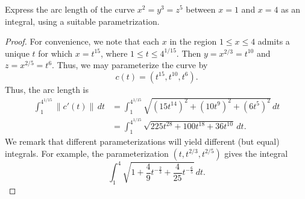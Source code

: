\documentclass[openany]{book}
\begin{document}
\begin{prob}[13]
    Express the arc length of the curve \( x^2 = y^3 = z^5 \) between \( x = 1 \) and \( x = 4 \) as an integral, using a suitable parametrization.
\end{prob}
\begin{proof}
    For convenience, we note that each $x$ in the region $1\le x\le 4$ admits a unique $t$ for which $x=t^{15}$, where $1\le t\le 4^{1/15}$. Then $y=x^{2/3}=t^{10}$ and $z=x^{2/5}=t^6$. Thus, we may parameterize the curve by
    \[c(t)=\left(t^{15},t^{10},t^{6}\right).\]
    Thus, the arc length is
    \begin{align*}
        \int_1^{4^{1/15}}\lVert{c'(t)}\rVert\,dt &= \int_1^{4^{1/15}}\sqrt{\left(15t^{14}\right)^2+\left(10t^9\right)^2+\left(6t^5\right)^2}\,dt \\
        &= \int_1^{4^{1/15}}\sqrt{225t^{28}+100t^{18}+36t^{10}}\,dt.
    \end{align*}
    We remark that different parameterizations will yield different (but equal) integrals. For example, the parameterization $\left(t,t^{2/3},t^{2/5}\right)$ gives the integral
    \[\int_{1}^{4}\sqrt{1+\frac{4}{9}t^{-\frac{2}{3}}+\frac{4}{25}t^{-\frac{6}{5}}}\,dt.\]
\end{proof}
\end{document}
